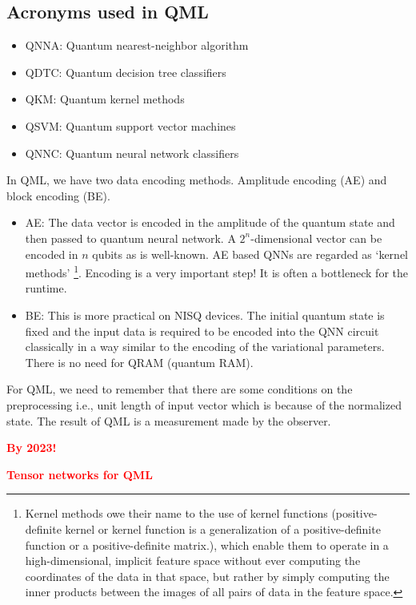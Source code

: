 \documentclass[11pt]{article}
\newcommand{\TODO}[1]{\textcolor{red}{\textbf{#1}}}
\begin{document}
\subsection{Acronyms used in QML} 

\begin{itemize}
\item QNNA: Quantum nearest-neighbor algorithm 
\item QDTC: Quantum decision tree classifiers
\item QKM: Quantum kernel methods
\item QSVM: Quantum support vector machines
\item QNNC: Quantum neural network classifiers
\end{itemize}

In QML, we have two data encoding methods. Amplitude encoding (AE) and block encoding (BE). 

\begin{itemize}
\item AE: The data vector is encoded in the amplitude of the quantum state and then passed to quantum neural network. 
A $2^{n}$-dimensional vector can be encoded in $n$ qubits as is well-known. AE based QNNs are regarded as 
`kernel methods' \footnote{Kernel methods owe their name to the use of kernel functions (positive-definite kernel or kernel function is a generalization of a positive-definite function or a positive-definite matrix.), 
which enable them to operate in a high-dimensional, implicit feature space without ever computing the coordinates of the data in that space, but rather by simply computing the inner products between the images of all pairs of data in the feature space.}. Encoding is a very important step! It is often a bottleneck for the runtime. 
\item BE: This is more practical on NISQ devices. The initial quantum state is fixed and 
the input data is required to be encoded into the QNN circuit classically in a way similar to the encoding of the variational parameters.
There is no need for QRAM (quantum RAM). 
\end{itemize}

For QML, we need to remember that there are some conditions on the 
preprocessing i.e., unit length of input vector which is because of the normalized state. 
The result of QML is a measurement made by the observer. 



\TODO{By 2023!} 

\TODO{Tensor networks for QML}
\end{document}
